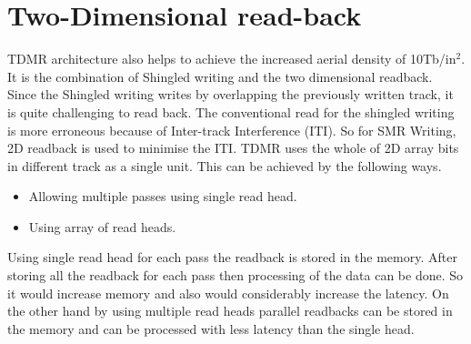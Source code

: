 \section{Two-Dimensional read-back}
TDMR architecture also helps to achieve the increased aerial density of 10Tb/in$^2$. It is the combination of Shingled writing and the two dimensional readback.~\cite{IEEE_HITACHI} Since the Shingled writing writes by overlapping the previously written track, it is quite challenging to read back. The conventional read for the shingled writing is more erroneous because of Inter-track Interference (ITI). So for SMR Writing, 2D readback is used to minimise the ITI. TDMR uses the whole of 2D array bits in different track as a single unit. This can be achieved by the following ways.
\begin{itemize}
	\item Allowing multiple passes using single read head.
	\item Using array of read heads.
\end{itemize}

Using single read head for each pass the readback is stored in the memory. After storing all the readback for each pass then processing of the data can be done. So it would increase memory and also would considerably increase the latency. On the other hand by using multiple read heads parallel readbacks can be stored in the memory and can be processed with less latency than the single head.~\cite{Elidrissi}




